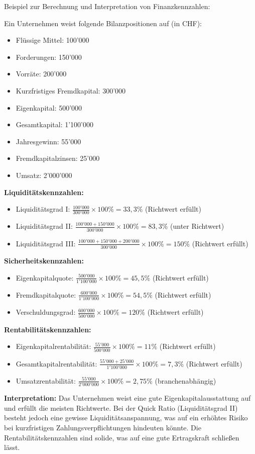 \begin{example}
Beispiel zur Berechnung und Interpretation von Finanzkennzahlen:

Ein Unternehmen weist folgende Bilanzpositionen auf (in CHF):
\begin{itemize}
    \item Flüssige Mittel: 100'000
    \item Forderungen: 150'000
    \item Vorräte: 200'000
    \item Kurzfristiges Fremdkapital: 300'000
    \item Eigenkapital: 500'000
    \item Gesamtkapital: 1'100'000
    \item Jahresgewinn: 55'000
    \item Fremdkapitalzinsen: 25'000
    \item Umsatz: 2'000'000
\end{itemize}

\textbf{Liquiditätskennzahlen:}
\begin{itemize}
    \item Liquiditätsgrad I: $\frac{100'000}{300'000} \times 100\% = 33,3\%$ (Richtwert erfüllt)
    \item Liquiditätsgrad II: $\frac{100'000 + 150'000}{300'000} \times 100\% = 83,3\%$ (unter Richtwert)
    \item Liquiditätsgrad III: $\frac{100'000 + 150'000 + 200'000}{300'000} \times 100\% = 150\%$ (Richtwert erfüllt)
\end{itemize}

\textbf{Sicherheitskennzahlen:}
\begin{itemize}
    \item Eigenkapitalquote: $\frac{500'000}{1'100'000} \times 100\% = 45,5\%$ (Richtwert erfüllt)
    \item Fremdkapitalquote: $\frac{600'000}{1'100'000} \times 100\% = 54,5\%$ (Richtwert erfüllt)
    \item Verschuldungsgrad: $\frac{600'000}{500'000} \times 100\% = 120\%$ (Richtwert erfüllt)
\end{itemize}

\textbf{Rentabilitätskennzahlen:}
\begin{itemize}
    \item Eigenkapitalrentabilität: $\frac{55'000}{500'000} \times 100\% = 11\%$ (Richtwert erfüllt)
    \item Gesamtkapitalrentabilität: $\frac{55'000 + 25'000}{1'100'000} \times 100\% = 7,3\%$ (Richtwert erfüllt)
    \item Umsatzrentabilität: $\frac{55'000}{2'000'000} \times 100\% = 2,75\%$ (branchenabhängig)
\end{itemize}

\textbf{Interpretation:} Das Unternehmen weist eine gute Eigenkapitalausstattung auf und erfüllt die meisten Richtwerte. Bei der Quick Ratio (Liquiditätsgrad II) besteht jedoch eine gewisse Liquiditätsanspannung, was auf ein erhöhtes Risiko bei kurzfristigen Zahlungsverpflichtungen hindeuten könnte. Die Rentabilitätskennzahlen sind solide, was auf eine gute Ertragskraft schließen lässt.
\end{example}

